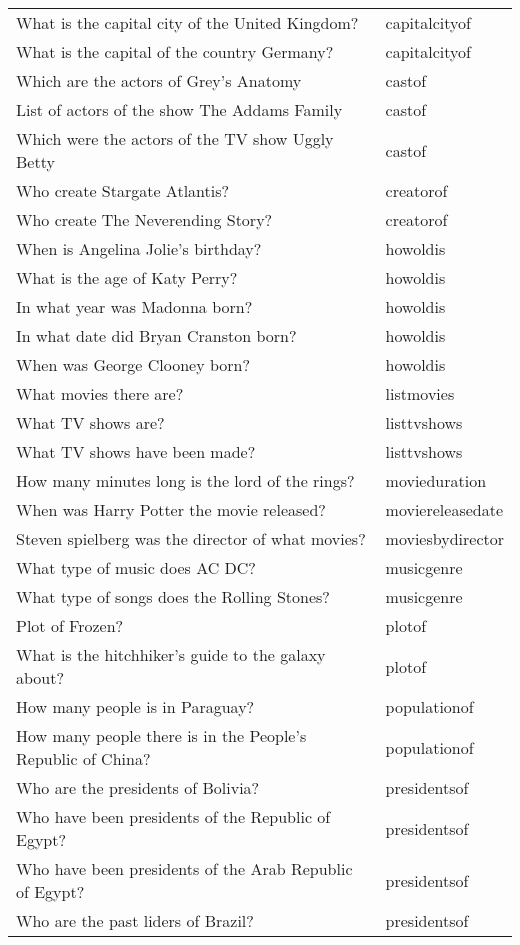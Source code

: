 \begin{longtable}{l l}
What is the capital city of the United Kingdom? & capitalcityof \\
What is the capital of the country Germany? & capitalcityof \\
Which are the actors of Grey's Anatomy & castof \\
List of actors of the show The Addams Family & castof \\
Which were the actors of the TV show Uggly Betty & castof \\
Who create Stargate Atlantis? & creatorof \\
Who create The Neverending Story? & creatorof \\
When is Angelina Jolie's birthday? & howoldis \\
What is the age of Katy Perry? & howoldis \\
In what year was Madonna born? & howoldis \\
In what date did Bryan Cranston born? & howoldis \\
When was George Clooney born? & howoldis \\
What movies there are? & listmovies \\
What TV shows are? & listtvshows \\
What TV shows have been made? & listtvshows \\
How many minutes long is the lord of the rings? & movieduration \\
When was Harry Potter the movie released? & moviereleasedate \\
Steven spielberg was the director of what movies? & moviesbydirector \\
What type of music does AC DC? & musicgenre \\
What type of songs does the Rolling Stones? & musicgenre \\
Plot of Frozen? & plotof \\
What is the hitchhiker's guide to the galaxy about? & plotof \\
How many people is in Paraguay? & populationof \\
How many people there is in the People's Republic of China? & populationof \\
Who are the presidents of Bolivia? & presidentsof \\
Who have been presidents of the Republic of Egypt? & presidentsof \\
Who have been presidents of the Arab Republic of Egypt? & presidentsof \\
Who are the past liders of Brazil? & presidentsof \\

\end{longtable}
